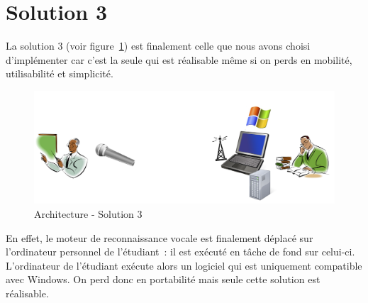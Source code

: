 \section{Solution 3}
La solution 3 (voir figure~\ref{fig:solution3}) est finalement celle que nous avons choisi d'implémenter car c'est la seule qui est réalisable même si on perds en mobilité, utilisabilité et simplicité.


\begin{figure}[h]
 \centering
 \includegraphics[scale=0.5]{./img/solution3.png}
 \caption{Architecture - Solution 3}
 \label{fig:solution3}
\end{figure}


En effet, le moteur de reconnaissance vocale est finalement déplacé sur l'ordinateur personnel de l'étudiant~: il est exécuté en tâche de fond sur celui-ci. L'ordinateur de l'étudiant exécute alors un logiciel qui est uniquement compatible avec Windows. On perd donc en portabilité mais seule cette solution est réalisable.

